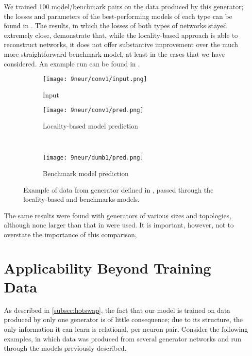We trained 100 model/benchmark pairs on the data produced by this generator; the 
losses and parameters of the best-performing models of each type can be found in 
. The results, in which the losses of both types 
of networks stayed extremely close, demonstrate that, while the locality-based 
approach is able to reconstruct networks, it does not offer substantive 
improvement over the much more straightforward benchmark model, at least in the 
cases that we have considered.  An example run can be found in 
.

\begin{figure}[h]
	\centering
	\hfill
	\begin{subfigure}{.2\textwidth}
		\centering
		\texttt{[image: 9neur/conv1/input.png]}
		\caption{Input}
	\end{subfigure}
	\hspace{2em}
	\begin{minipage}{.65\textwidth}
		\centering
	\begin{subfigure}{.9\textwidth}
		\centering
		\texttt{[image: 9neur/conv1/pred.png]}
		\caption{Locality-based model prediction}
	\end{subfigure}\\
	\begin{subfigure}{.9\textwidth}
		\centering
		\texttt{[image: 9neur/dumb1/pred.png]}
		\caption{Benchmark model prediction}
	\end{subfigure}
	\end{minipage}
	\caption{Example of data from generator defined in , 
	passed through the locality-based and benchmarks models.}
	\label{fig:samepred}
\end{figure}\noindent
\newpage
The same results were found with generators of various sizes and topologies, 
although none larger than that in  were used. It is 
important, however, not to overstate the importance of this comparison, 

\section{Applicability Beyond Training Data}
As described in \ref{subsec:hotswap}, the fact that our model is trained on data 
produced by only one generator is of little consequence; due to its structure, 
the only information it can learn is relational, per neuron pair. Consider the 
following examples, in which data was produced from several generator networks 
and run through the models previously described.

